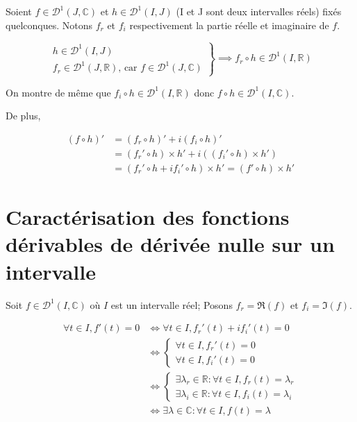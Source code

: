 \documentclass[french]{article}
\begin{document}
Soient $f \in \mathcal D ^1(J, \mathbb C) $ et $h \in \mathcal D^1(I, J)$ (I et J sont deux intervalles réels) fixés quelconques. Notons $f_r$ et $f_i$ respectivement la partie réelle et imaginaire de $f$.

\begin{equation}
	\left .
	\begin{array}{ll}
		h \in \mathcal D^1(I, J) \\
		f_r \in \mathcal D^1(J, \mathbb R) \text{, car } f \in \mathcal D^1(J, \mathbb C)
	\end{array}
	\right \}
	\implies f_r \circ h \in \mathcal D^1(I, \mathbb R)
\end{equation}

On montre de même que $f_i \circ h \in \mathcal D^1(I, \mathbb  R)$ donc $f \circ h \in \mathcal D^1(I, \mathbb C)$.

De plus,

\begin{align*}
	(f \circ h)' &= (f_r \circ h)' + i (f_i \circ h)' \\
	&= (f_r' \circ h ) \times h' + i((f_i' \circ h) \times h')\\
	&=(f_r' \circ h + if_i' \circ h) \times h' = (f' \circ h) \times h'
\end{align*}

\section{Caractérisation des fonctions dérivables de dérivée nulle sur un intervalle}

Soit $f \in \mathcal D ^1 (I, \mathbb C)$ où $I$ est un intervalle réel;
Posons $f_r = \Re (f)$ et $f_i = \Im(f)$.

\begin{align*}
\forall t \in I, f'(t) = 0 &\iff \forall t \in I, f_r'(t) + i f_i'(t) = 0 \\
&\iff \begin{cases}
	\forall t \in I, f_r'(t) = 0 \\
	\forall t \in I, f_i'(t) = 0
\end{cases} \\
&\iff \begin{cases}
	\exists \lambda_r \in \mathbb R : \forall t \in I,  f_r(t) = \lambda_r \\
		\exists \lambda_i \in \mathbb R : \forall t \in I,  f_i(t) = \lambda_i
\end{cases} \\
&\iff \exists \lambda \in \mathbb C : \forall t \in I,  f(t) = \lambda
\end{align*}
\end{document}
